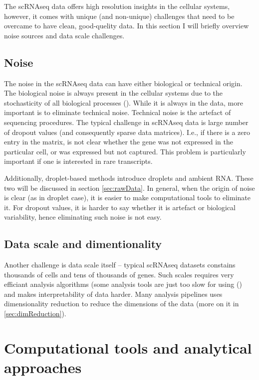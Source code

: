 The scRNAseq data offers high resolution insights in the cellular systems, however,
it comes with unique (and non-unique) challenges that need to be overcame to have clean, good-quelity data.
In this section I will briefly overview noise sources and data scale challenges.

\subsection{Noise}

The noise in the scRNAseq data can have either biological or technical origin.
The biological noise is always present in the cellular systems due to the stochasticity of all biological processes (\cite{Vaz2017}).
While it is always in the data, more important is to eliminate technical noise.
Technical noise is the artefact of sequencing procedures.
The typical challenge in scRNAseq data is large number of dropout values (and consequently sparse data matrices).
I.e., if there is a zero entry in the matrix, is not clear whether the gene was not expressed in the particular cell,
or was expressed but not captured.
This problem is particularly important if one is interested in rare transcripts.

Additionally, droplet-based methods introduce droplets and ambient RNA.
These two will be discussed in section \ref{sec:rawData}.
In general, when the origin of noise is clear (as in droplet case), it is easier to make computational tools to eliminate it.
For dropout values, it is harder to say whether it is artefact or biological variability, hence eliminating such noise is not easy.

\subsection{Data scale and dimentionality}

Another challenge is data scale itself – typical scRNAseq datasets constains thousands of cells and tens of thousands of genes.
Such scales requires very efficiant analysis algorithms (some analysis tools are just too slow for using (\cite{McCalla2023})
and makes interpretability of data harder.
Many analysis pipelines uses dimensionality reduction to reduce the dimensions of the data (more on it in \ref{sec:dimReduction}).

\section{Computational tools and analytical approaches}

